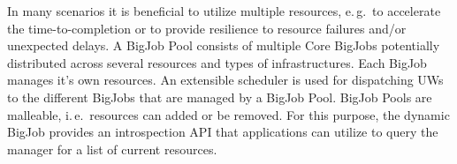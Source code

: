 \documentclass[conference,final]{IEEEtran}
\begin{document}

In many scenarios it is beneficial to utilize multiple resources, e.\,g.\ to
accelerate the time-to-completion or to provide resilience to resource failures
and/or unexpected delays. A BigJob Pool consists of multiple Core
BigJobs potentially distributed across several resources and types of
infrastructures. Each BigJob manages it's own resources. An extensible scheduler
is used for dispatching UWs to the different BigJobs that are managed by a
BigJob Pool. BigJob Pools are malleable, i.\,e.\ resources can added or be
removed. For this purpose, the dynamic BigJob provides an introspection API that 
applications can utilize to query the manager for a list of current resources.




% 
\end{document}
